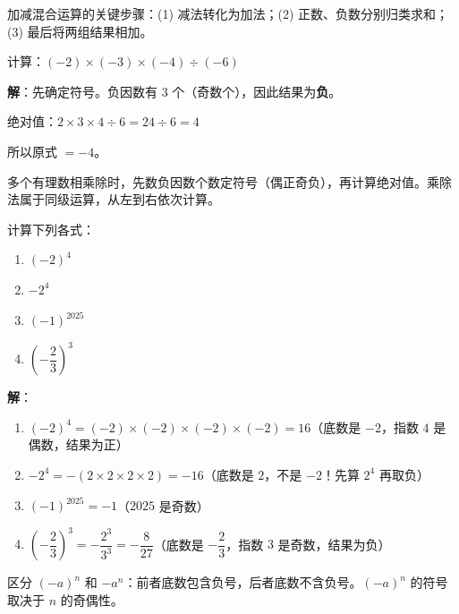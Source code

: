 \documentclass[12pt, a4paper]{ctexart}
\begin{document}
\begin{tipbox}[方法总结]
加减混合运算的关键步骤：(1) 减法转化为加法；(2) 正数、负数分别归类求和；(3) 最后将两组结果相加。
\end{tipbox}

\vspace{6pt}

\begin{examplebox}[【例题2】有理数乘除法与符号判断]
计算：$(-2) \times (-3) \times (-4) \div (-6)$
\end{examplebox}

\textbf{解}：先确定符号。负因数有 $3$ 个（奇数个），因此结果为\textbf{负}。

绝对值：$2 \times 3 \times 4 \div 6 = 24 \div 6 = 4$

所以原式 $= -4$。

\begin{tipbox}[方法总结]
多个有理数相乘除时，先数负因数个数定符号（偶正奇负），再计算绝对值。乘除法属于同级运算，从左到右依次计算。
\end{tipbox}

\vspace{6pt}

\begin{examplebox}[【例题3】乘方运算与符号辨析]
计算下列各式：
\begin{enumerate}[leftmargin=*]
  \item $(-2)^4$
  \item $-2^4$
  \item $(-1)^{2025}$
  \item $\left(-\dfrac{2}{3}\right)^3$
\end{enumerate}
\end{examplebox}

\textbf{解}：
\begin{enumerate}[leftmargin=*]
  \item $(-2)^4 = (-2) \times (-2) \times (-2) \times (-2) = 16$（底数是 $-2$，指数 $4$ 是偶数，结果为正）
  \item $-2^4 = -(2 \times 2 \times 2 \times 2) = -16$（底数是 $2$，不是 $-2$！先算 $2^4$ 再取负）
  \item $(-1)^{2025} = -1$（$2025$ 是奇数）
  \item $\left(-\dfrac{2}{3}\right)^3 = -\dfrac{2^3}{3^3} = -\dfrac{8}{27}$（底数是 $-\dfrac{2}{3}$，指数 $3$ 是奇数，结果为负）
\end{enumerate}

\begin{tipbox}[方法总结]
区分 $(-a)^n$ 和 $-a^n$：前者底数包含负号，后者底数不含负号。$(-a)^n$ 的符号取决于 $n$ 的奇偶性。
\end{tipbox}
\end{document}
